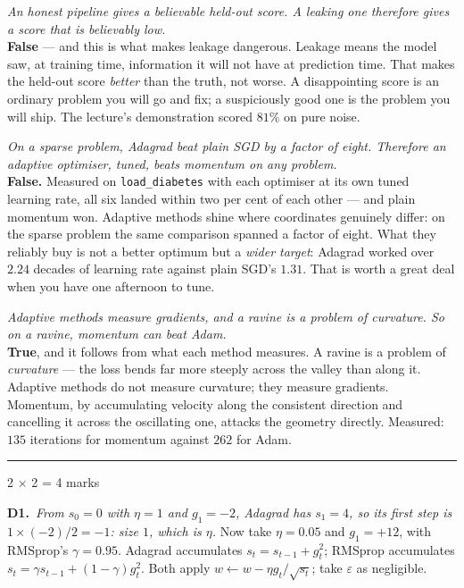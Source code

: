 \documentclass[10pt,a4paper]{article}
\newcommand{\parthead}[2]{\vspace{2pt}\noindent\rule{\linewidth}{0.4pt}\par\vspace{2pt}%
  \noindent{\bfseries Part #1}\hfill{\small #2}\par\vspace{1pt}}
\begin{document}
\begin{sC}

  \item \emph{\emph{An honest pipeline gives a believable held-out score.} A leaking one therefore gives a score that is believably \emph{low}.}\\[2pt] \textbf{False} --- and this is what makes leakage dangerous. Leakage means the model saw, at training time, information it will not have at prediction time. That makes the held-out score \emph{better} than the truth, not worse. A disappointing score is an ordinary problem you will go and fix; a suspiciously good one is the problem you will ship. The lecture's demonstration scored $81\%$ on pure noise.

  \item \emph{\emph{On a sparse problem, Adagrad beat plain SGD by a factor of eight.} Therefore an adaptive optimiser, tuned, beats momentum on any problem.}\\[2pt] \textbf{False.} Measured on \texttt{load\_diabetes} with each optimiser at its own tuned learning rate, all six landed within two per cent of each other --- and plain momentum won. Adaptive methods shine where coordinates genuinely differ: on the sparse problem the same comparison spanned a factor of eight. What they reliably buy is not a better optimum but a \emph{wider target}: Adagrad worked over $2.24$ decades of learning rate against plain SGD's $1.31$. That is worth a great deal when you have one afternoon to tune.

  \item \emph{\emph{Adaptive methods measure gradients, and a ravine is a problem of curvature.} So on a ravine, momentum can beat Adam.}\\[2pt] \textbf{True}, and it follows from what each method measures. A ravine is a problem of \emph{curvature} --- the loss bends far more steeply across the valley than along it. Adaptive methods do not measure curvature; they measure gradients. Momentum, by accumulating velocity along the consistent direction and cancelling it across the oscillating one, attacks the geometry directly. Measured: $135$ iterations for momentum against $262$ for Adam.

\end{sC}

\newpage

\parthead{D --- Short answer}{2 $\times$ 2 = 4 marks}

\textbf{D1.}\ \emph{From $s_0 = 0$ with $\eta = 1$ and $g_1 = -2$, Adagrad has $s_1 = 4$, so its first step is $1 \times (-2)/2 = -1$: size $1$, which is $\eta$.} Now take $\eta = 0.05$ and $g_1 = +12$, with RMSprop's $\gamma = 0.95$. Adagrad accumulates $s_t = s_{t-1} + g_t^2$; RMSprop accumulates $s_t = \gamma s_{t-1} + (1-\gamma)g_t^2$. Both apply $w \leftarrow w - \eta g_t/\sqrt{s_t}$; take $\varepsilon$ as negligible.
\end{document}
